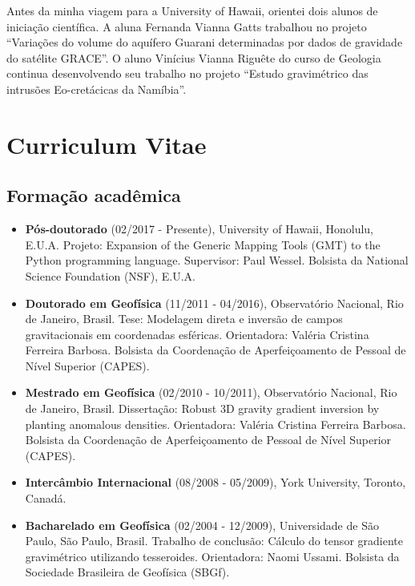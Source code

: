 \documentclass[12pt,a4paper,oneside,titlepage,onecolumn]{article}
\begin{document}
Antes da minha viagem para a University of Hawaii, orientei dois alunos de
iniciação científica.
A aluna Fernanda Vianna Gatts trabalhou no projeto ``Variações do volume do
aquífero Guarani determinadas por dados de gravidade do satélite GRACE''.
O aluno Vinícius Vianna Riguête do curso de Geologia continua desenvolvendo seu
trabalho no projeto ``Estudo gravimétrico das intrusões
Eo-cretácicas da Namíbia''.


\section{Curriculum Vitae}

\subsection{Formação acadêmica}

\begin{itemize}
    \item \textbf{Pós-doutorado} (02/2017 - Presente),
        University of Hawaii, Honolulu, E.U.A.
        Projeto: Expansion of the Generic Mapping Tools (GMT) to the Python
        programming language.
        Supervisor: Paul Wessel.
        Bolsista da National Science Foundation (NSF), E.U.A.
    \item \textbf{Doutorado em Geofísica} (11/2011 - 04/2016),
        Observatório Nacional, Rio de Janeiro, Brasil.
        Tese: Modelagem direta e inversão de campos gravitacionais em
        coordenadas esféricas.
        Orientadora: Valéria Cristina Ferreira Barbosa.
        Bolsista da Coordenação de Aperfeiçoamento de Pessoal de Nível
        Superior (CAPES).
    \item \textbf{Mestrado em Geofísica} (02/2010 - 10/2011),
        Observatório Nacional, Rio de Janeiro, Brasil.
        Dissertação: Robust 3D gravity gradient inversion by planting anomalous
        densities.
        Orientadora: Valéria Cristina Ferreira Barbosa.
        Bolsista da Coordenação de Aperfeiçoamento de Pessoal de Nível
        Superior (CAPES).
    \item \textbf{Intercâmbio Internacional} (08/2008 - 05/2009),
        York University, Toronto, Canadá.
    \item \textbf{Bacharelado em Geofísica} (02/2004 - 12/2009),
        Universidade de São Paulo, São Paulo, Brasil.
        Trabalho de conclusão: Cálculo do tensor gradiente gravimétrico
        utilizando tesseroides.
        Orientadora: Naomi Ussami.
        Bolsista da Sociedade Brasileira de Geofísica (SBGf).
\end{itemize}
\end{document}
